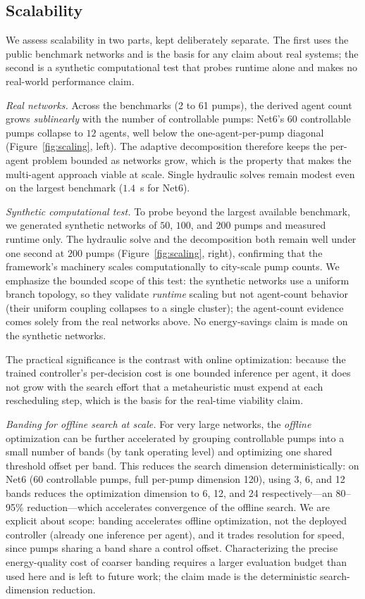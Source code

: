 \documentclass[11pt,a4paper]{article}
\begin{document}
\subsection{Scalability}
\label{sec:scalability}
We assess scalability in two parts, kept deliberately separate. The first uses
the public benchmark networks and is the basis for any claim about real systems;
the second is a synthetic computational test that probes runtime alone and makes
no real-world performance claim.

\emph{Real networks.} Across the benchmarks (2 to 61 pumps), the derived agent
count grows \emph{sublinearly} with the number of controllable pumps: Net6's $60$
controllable pumps collapse to $12$ agents, well below the one-agent-per-pump
diagonal (Figure~\ref{fig:scaling}, left). The adaptive decomposition therefore
keeps the per-agent problem bounded as networks grow, which is the property that
makes the multi-agent approach viable at scale. Single hydraulic solves remain
modest even on the largest benchmark ($1.4$~s for Net6).

\emph{Synthetic computational test.} To probe beyond the largest available
benchmark, we generated synthetic networks of $50$, $100$, and $200$ pumps and
measured runtime only. The hydraulic solve and the decomposition both remain well
under one second at $200$ pumps (Figure~\ref{fig:scaling}, right), confirming that
the framework's machinery scales computationally to city-scale pump counts. We
emphasize the bounded scope of this test: the synthetic networks use a uniform
branch topology, so they validate \emph{runtime} scaling but not agent-count
behavior (their uniform coupling collapses to a single cluster); the agent-count
evidence comes solely from the real networks above. No energy-savings claim is
made on the synthetic networks.

The practical significance is the contrast with online optimization: because the
trained controller's per-decision cost is one bounded inference per agent, it does
not grow with the search effort that a metaheuristic must expend at each
rescheduling step, which is the basis for the real-time viability claim.

\emph{Banding for offline search at scale.} For very large networks, the
\emph{offline} optimization can be further accelerated by grouping controllable
pumps into a small number of bands (by tank operating level) and optimizing one
shared threshold offset per band. This reduces the search dimension
deterministically: on Net6 (60 controllable pumps, full per-pump dimension 120),
using 3, 6, and 12 bands reduces the optimization dimension to 6, 12, and 24
respectively---an 80--95\% reduction---which accelerates convergence of the
offline search. We are explicit about scope: banding accelerates offline
optimization, not the deployed controller (already one inference per agent), and
it trades resolution for speed, since pumps sharing a band share a control offset.
Characterizing the precise energy-quality cost of coarser banding requires a
larger evaluation budget than used here and is left to future work; the claim made
is the deterministic search-dimension reduction.
\end{document}
